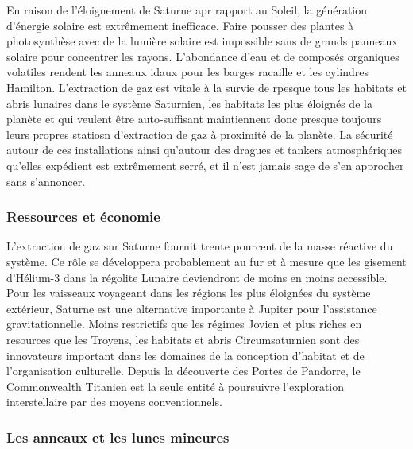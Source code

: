                                                                   En raison de l'éloignement de Saturne apr rapport au Soleil, la génération d'énergie solaire est extrêmement inefficace. Faire pousser des plantes à photosynthèse avec de la lumière solaire est impossible sans de grands panneaux solaire pour concentrer les rayons. L'abondance d'eau et de composés organiques volatiles rendent les anneaux idaux pour les barges racaille et les cylindres Hamilton. L'extraction de gaz est vitale à la survie de rpesque tous les habitats et abris lunaires dans le système Saturnien, les habitats les plus éloignés de la planète et qui veulent être auto-suffisant maintiennent donc presque toujours leurs propres statiosn d'extraction de gaz à proximité de la planète. La sécurité autour de ces installations ainsi qu'autour des dragues et tankers atmosphériques qu'elles expédient est extrêmement serré, et il n'est jamais sage de s'en approcher sans s'annoncer. 

                                                                  \subsubsection{Ressources et économie} \label{sec:saturn-resources-economics} 

                                                                  L'extraction de gaz sur Saturne fournit trente pourcent de la masse réactive du système. Ce rôle se développera probablement au fur et à mesure que les gisement d'Hélium-3 dans la régolite Lunaire deviendront de moins en moins accessible. Pour les vaisseaux voyageant dans les régions les plus éloignées du système extérieur, Saturne est une alternative importante à Jupiter pour l'assistance gravitationnelle. Moins restrictifs que les régimes Jovien et plus riches en resources que les Troyens, les habitats et abris Circumsaturnien sont des innovateurs important dans les domaines de la conception d'habitat et de l'organisation culturelle. Depuis la découverte des Portes de Pandorre, le Commonwealth Titanien est la seule entité à poursuivre l'exploration interstellaire par des moyens conventionnels. 

                                                                  \subsubsection{Les anneaux et les lunes mineures} \label{sec:rings-class-minor} 

